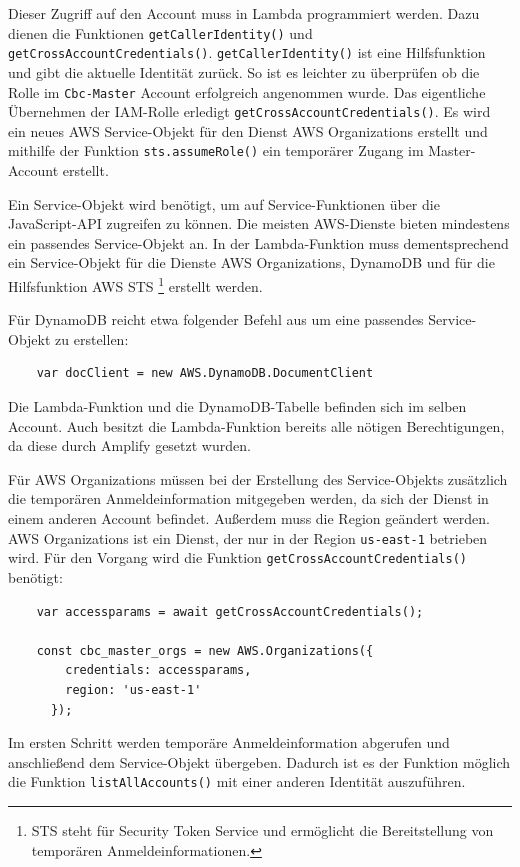 Dieser Zugriff auf den Account muss in Lambda programmiert werden.
Dazu dienen die Funktionen \verb+getCallerIdentity()+ und \verb+getCrossAccountCredentials()+.
\verb+getCallerIdentity()+ ist eine Hilfsfunktion und gibt die aktuelle Identität zurück.
So ist es leichter zu überprüfen ob die Rolle im \verb+Cbc-Master+ Account erfolgreich angenommen wurde.
Das eigentliche Übernehmen der IAM-Rolle erledigt \verb+getCrossAccountCredentials()+.
Es wird ein neues AWS Service-Objekt für den Dienst AWS Organizations erstellt und mithilfe der Funktion \verb+sts.assumeRole()+ ein temporärer Zugang im Master-Account erstellt.

Ein Service-Objekt wird benötigt, um auf Service-Funktionen über die JavaScript-API zugreifen zu können.
Die meisten AWS-Dienste bieten mindestens ein passendes Service-Objekt an.
In der Lambda-Funktion muss dementsprechend ein Service-Objekt für die Dienste AWS Organizations, DynamoDB und für die Hilfsfunktion AWS STS \footnote{STS steht für Security Token Service und ermöglicht die Bereitstellung von temporären Anmeldeinformationen.} erstellt werden.
\cite[]{ServiceObject}

Für DynamoDB reicht etwa folgender Befehl aus um eine passendes Service-Objekt zu erstellen:
\begin{verbatim}
    var docClient = new AWS.DynamoDB.DocumentClient
\end{verbatim}

Die Lambda-Funktion und die DynamoDB-Tabelle befinden sich im selben Account.
Auch besitzt die Lambda-Funktion bereits alle nötigen Berechtigungen, da diese durch Amplify gesetzt wurden.

Für AWS Organizations müssen bei der Erstellung des Service-Objekts zusätzlich die temporären Anmeldeinformation mitgegeben werden, da sich der Dienst in einem anderen Account befindet.
Außerdem muss die Region geändert werden. AWS Organizations ist ein Dienst, der nur in der Region \verb+us-east-1+ betrieben wird.
Für den Vorgang wird die Funktion \verb+getCrossAccountCredentials()+ benötigt:

\begin{verbatim}
    var accessparams = await getCrossAccountCredentials();

    const cbc_master_orgs = new AWS.Organizations({
        credentials: accessparams,
        region: 'us-east-1'
      });
\end{verbatim}

Im ersten Schritt werden temporäre Anmeldeinformation abgerufen und anschließend dem Service-Objekt übergeben.
Dadurch ist es der Funktion möglich die Funktion \verb+listAllAccounts()+ mit einer anderen Identität auszuführen.


